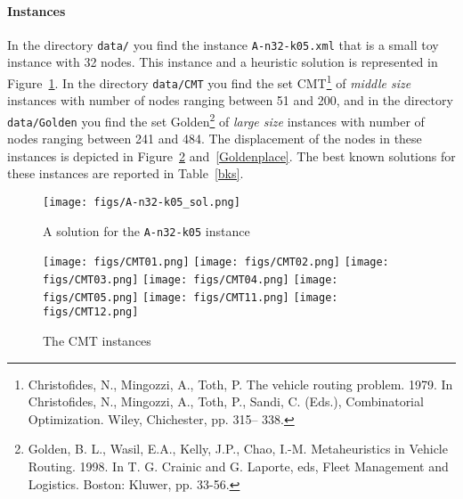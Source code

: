 \paragraph{Instances}
In the directory \verb!data/! you find the instance
\lstinline{A-n32-k05.xml} that is a small toy instance with 32 nodes.
This instance and a heuristic solution is represented in
Figure~\ref{A-n32-k05}.  In the directory \verb!data/CMT! you find the
set CMT\footnote{Christofides, N., Mingozzi, A., Toth, P. The vehicle
  routing problem. 1979.  In Christofides, N., Mingozzi, A., Toth, P.,
  Sandi, C. (Eds.), Combinatorial Optimization. Wiley, Chichester,
  pp. 315– 338.} of \emph{middle size} instances with number of nodes
ranging between 51 and 200, and in the directory \verb!data/Golden! you
find the set Golden\footnote{Golden, B. L., Wasil, E.A., Kelly, J.P.,
  Chao, I.-M. Metaheuristics in Vehicle Routing. 1998. In T. G. Crainic
  and G. Laporte, eds, Fleet Management and Logistics. Boston: Kluwer,
  pp. 33-56.} of \emph{large size} instances with number of nodes
ranging between 241 and 484. The displacement of the nodes in these
instances is depicted in Figure~\ref{CMTplace} and~\ref{Goldenplace}.
The best known solutions for these instances are reported in
Table~\ref{bks}.

%
%

\begin{figure}
  \centering
  \texttt{[image: figs/A-n32-k05\_sol.png]}
\caption{\label{A-n32-k05} A solution for the \texttt{A-n32-k05} instance}
\end{figure}

\begin{figure}
  \centering
  \texttt{[image: figs/CMT01.png]}
  \texttt{[image: figs/CMT02.png]}
  \texttt{[image: figs/CMT03.png]}
  \texttt{[image: figs/CMT04.png]}
  \texttt{[image: figs/CMT05.png]}
  \texttt{[image: figs/CMT11.png]}
  \texttt{[image: figs/CMT12.png]}
\caption{\label{CMTplace} The CMT instances}
\end{figure}



